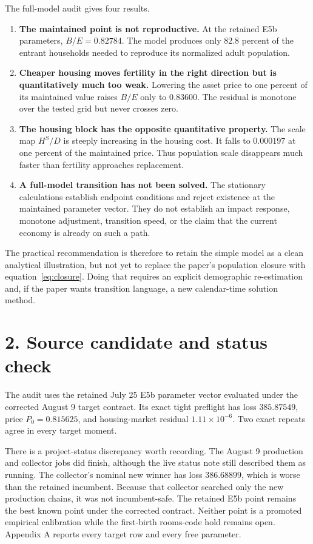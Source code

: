 \documentclass[11pt]{article}
\begin{document}
The full-model audit gives four results.
\begin{enumerate}
 \item \textbf{The maintained point is not reproductive.}  At the retained E5b
 parameters, $B/E=0.82784$.  The model produces only 82.8 percent of the entrant
 households needed to reproduce its normalized adult population.
 \item \textbf{Cheaper housing moves fertility in the right direction but is
 quantitatively much too weak.}  Lowering the asset price to one percent of its
 maintained value raises $B/E$ only to $0.83600$.  The residual is monotone over
 the tested grid but never crosses zero.
 \item \textbf{The housing block has the opposite quantitative property.}
 The scale map $H^S/D$ is steeply increasing in the housing cost.  It falls to
 $0.000197$ at one percent of the maintained price.  Thus population scale
 disappears much faster than fertility approaches replacement.
 \item \textbf{A full-model transition has not been solved.}  The stationary
 calculations establish endpoint conditions and reject existence at the
 maintained parameter vector.  They do not establish an impact response,
 monotone adjustment, transition speed, or the claim that the current economy
 is already on such a path.
\end{enumerate}

The practical recommendation is therefore to retain the simple model as a
clean analytical illustration, but not yet to replace the paper's population
closure with equation~\eqref{eq:closure}.  Doing that requires an explicit
demographic re-estimation and, if the paper wants transition language, a new
calendar-time solution method.

\newpage
\section*{2. Source candidate and status check}

The audit uses the retained July 25 E5b parameter vector evaluated under the
corrected August 9 target contract.  Its exact tight preflight has loss
$385.87549$, price $P_0=0.815625$, and housing-market residual
$1.11\times10^{-6}$.  Two exact repeats agree in every target moment.

There is a project-status discrepancy worth recording.  The August 9 production
and collector jobs did finish, although the live status note still described
them as running.  The collector's nominal new winner has loss $386.68899$, which
is worse than the retained incumbent.  Because that collector searched only the
new production chains, it was not incumbent-safe.  The retained E5b point
remains the best known point under the corrected contract.  Neither point is a
promoted empirical calibration while the first-birth rooms-code hold remains
open.  Appendix A reports every target row and every free parameter.
\end{document}
